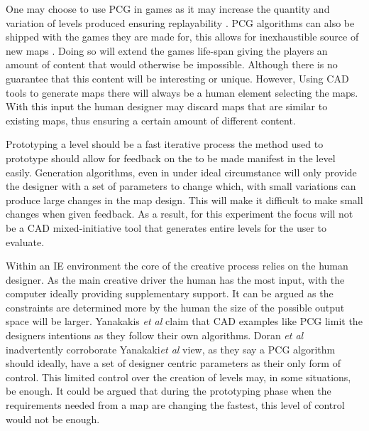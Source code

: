 \documentclass[journal]{IEEEtran}
\begin{document}
One may choose to use PCG in games as it may increase the quantity and variation of levels produced ensuring replayability \cite{karavolos2015mixed}. PCG algorithms can also be shipped with the games they are made for, this allows for inexhaustible source of new maps \cite{johnson2010cellular}. Doing so will extend the games life-span giving the players an amount of content that would otherwise be impossible. Although there is no guarantee that this content will be interesting or unique.  However, Using CAD tools to generate maps there will always be a human element selecting the maps. With this input the human designer may discard maps that are similar to existing maps, thus ensuring a certain amount of different content. 

Prototyping a level should be a fast iterative process \cite{smith2011tanagra} the method used to prototype should allow for feedback on the to be made manifest in the level easily.  Generation algorithms, even in under ideal circumstance will only provide the designer with a set of parameters to change\cite{doran2010controlled} which, with small variations can produce large changes in the map design\cite{regier2009random}. This will make it difficult to make small changes when given feedback. As a result, for this experiment the focus will not be a CAD mixed-initiative tool that generates entire levels for the user to evaluate.

Within an IE environment  the core of the creative process relies on the human designer. As the main creative driver the human has the most input, with the computer ideally providing supplementary support. It can be argued as the constraints are determined more by the human the size of the possible output space will be larger. Yanakakis \textit{et al} \cite{yannakakis2014mixed} claim that CAD examples like PCG limit the designers intentions as they follow their own algorithms. Doran \textit{et al}\cite{doran2010controlled} inadvertently corroborate Yanakaki\textit{et al}\cite{yannakakis2014mixed} view, as they say a PCG algorithm should ideally, have a set of designer centric parameters as their only form of control. This limited control over the creation of levels may, in some situations, be enough. It could be argued that during the prototyping phase when the requirements needed from a map are changing the fastest, this level of control would not be enough. 
\end{document}
